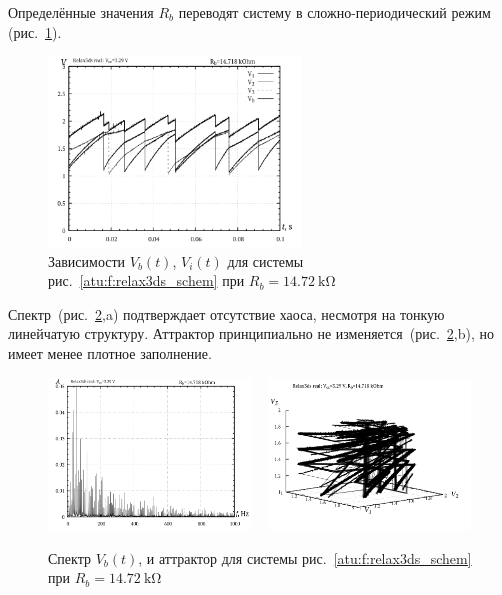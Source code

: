 Определённые значения $R_b$ переводят систему в сложно-периодический режим
(рис.~\ref{atu:f:relax3ds_t_14718}).

\begin{figure}[htb!]
  \centerline{\includegraphics[width=0.6\textwidth]{p/relax3ds_t_014718.png} }
  \caption{Зависимости $V_b(t)$, $V_i(t)$ для системы рис.~\ref{atu:f:relax3ds_schem} при $R_b=\SI{14.72}{\kilo\ohm}$ }
  \label{atu:f:relax3ds_t_14718}
\end{figure}

Спектр~(рис.~\ref{atu:f:relax3ds_f_14718},a)
подтверждает отсутствие хаоса,
несмотря на тонкую линейчатую структуру.
Аттрактор принципиально не изменяется~(рис.~\ref{atu:f:relax3ds_f_14718},b),
но имеет менее плотное заполнение.

\begin{figure}[htb!]
  \centerline{
    \includegraphics[width=0.48\textwidth]{p/relax3ds_f_014718.png}
    ~
    \includegraphics[width=0.48\textwidth]{p/relax3ds_v1v2v3_014718.png}
  }
  \caption{Спектр $V_b(t)$, и аттрактор для системы рис.~\ref{atu:f:relax3ds_schem} при $R_b=\SI{14.72}{\kilo\ohm}$ }
  \label{atu:f:relax3ds_f_14718}
\end{figure}

